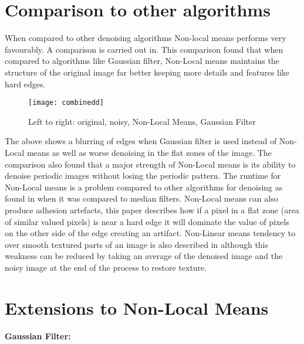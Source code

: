 \documentclass[11pt,letterpaper]{article}
\begin{document}
\section*{Comparison to other algorithms}
When compared to other denoising algorithms Non-local means performs very favourably. A comparison is carried out in\cite{paper3}. This comparison found that when compared to algorithms like Gaussian filter, Non-Local means maintains the structure of the original image far better keeping more details and features like hard edges.
\begin{figure}[H]
\centering
\texttt{[image: combinedd]}
\caption{Left to right: original, noisy, Non-Local Means, Gaussian Filter}
\end{figure}
The above shows a blurring of edges when Gaussian filter is used instead of Non-Local means as well as worse denoising in the flat zones of the image.
The comparison\cite{paper3} also found that a major strength of Non-Local means is its ability to denoise periodic images without losing the periodic pattern. The runtime for Non-Local means is a problem compared to other algorithms for denoising as found in\cite{paper4} when it was compared to median filters. Non-Local means can also produce adhesion artefacts\cite{paper5}, this paper describes how if a pixel in a flat zone (area of similar valued pixels) is near a hard edge it will dominate the value of pixels on the other side of the edge creating an artifact. Non-Linear means tendency to over smooth textured parts of an image is also described in \cite{paper5} although this weakness can be reduced by taking an average of the denoised image and the noisy image at the end of the process to restore texture\cite{paper5}.

\section*{Extensions to Non-Local Means}
\paragraph{Gaussian Filter:}
\end{document}
